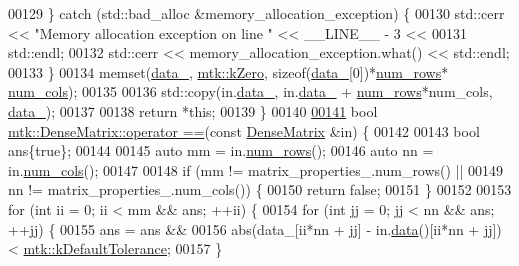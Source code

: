 \begin{DoxyCode}
00129   \} \textcolor{keywordflow}{catch} (std::bad\_alloc &memory\_allocation\_exception) \{
00130     std::cerr << \textcolor{stringliteral}{"Memory allocation exception on line "} << \_\_LINE\_\_ - 3 <<
00131       std::endl;
00132     std::cerr << memory\_allocation\_exception.what() << std::endl;
00133   \}
00134   memset(\hyperlink{classmtk_1_1DenseMatrix_a7893e4e5c8d2e2de32b156177e78cb6f}{data\_}, \hyperlink{group__c01-roots_ga59a451a5fae30d59649bcda274fea271}{mtk::kZero}, \textcolor{keyword}{sizeof}(\hyperlink{classmtk_1_1DenseMatrix_a7893e4e5c8d2e2de32b156177e78cb6f}{data\_}[0])*\hyperlink{classmtk_1_1DenseMatrix_a53f3afb3b6a8d21854458aaa9663cc74}{num\_rows}*
      \hyperlink{classmtk_1_1DenseMatrix_a41747502d468c6728a4be31501b16e0e}{num\_cols});
00135 
00136   std::copy(in.\hyperlink{classmtk_1_1DenseMatrix_a7893e4e5c8d2e2de32b156177e78cb6f}{data\_}, in.\hyperlink{classmtk_1_1DenseMatrix_a7893e4e5c8d2e2de32b156177e78cb6f}{data\_} + \hyperlink{classmtk_1_1DenseMatrix_a53f3afb3b6a8d21854458aaa9663cc74}{num\_rows}*num\_cols, \hyperlink{classmtk_1_1DenseMatrix_a7893e4e5c8d2e2de32b156177e78cb6f}{data\_});
00137 
00138   \textcolor{keywordflow}{return} *\textcolor{keyword}{this};
00139 \}
00140 
\hypertarget{mtk__dense__matrix_8cc_source_l00141}{}\hyperlink{classmtk_1_1DenseMatrix_a94ab5a02d9cf81c17b6f68f4c41cb797}{00141} \textcolor{keywordtype}{bool} \hyperlink{classmtk_1_1DenseMatrix_a94ab5a02d9cf81c17b6f68f4c41cb797}{mtk::DenseMatrix::operator ==}(\textcolor{keyword}{const} 
      \hyperlink{classmtk_1_1DenseMatrix}{DenseMatrix} &in) \{
00142 
00143   \textcolor{keywordtype}{bool} ans\{\textcolor{keyword}{true}\};
00144 
00145   \textcolor{keyword}{auto} mm = in.\hyperlink{classmtk_1_1DenseMatrix_a53f3afb3b6a8d21854458aaa9663cc74}{num\_rows}();
00146   \textcolor{keyword}{auto} nn = in.\hyperlink{classmtk_1_1DenseMatrix_a41747502d468c6728a4be31501b16e0e}{num\_cols}();
00147 
00148   \textcolor{keywordflow}{if} (mm != matrix\_properties\_.num\_rows() ||
00149       nn != matrix\_properties\_.num\_cols()) \{
00150     \textcolor{keywordflow}{return} \textcolor{keyword}{false};
00151   \}
00152 
00153   \textcolor{keywordflow}{for} (\textcolor{keywordtype}{int} ii = 0; ii < mm && ans; ++ii) \{
00154     \textcolor{keywordflow}{for} (\textcolor{keywordtype}{int} jj = 0; jj < nn && ans; ++jj) \{
00155       ans = ans &&
00156         abs(data\_[ii*nn + jj] - in.\hyperlink{classmtk_1_1DenseMatrix_a0c33b8a9e01d157c61ddbdf807c25d84}{data}()[ii*nn + jj]) < 
      \hyperlink{group__c01-roots_gae914b125d81d1b97e0aee7bbc7739786}{mtk::kDefaultTolerance};
00157     \}

\end{DoxyCode}
